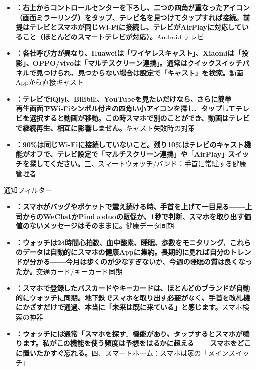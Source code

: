 \begin{itemize}
  \item \textbf{：右上からコントロールセンターを下ろし、二つの四角が重なったアイコン（画面ミラーリング）をタップ、テレビ名を見つけてタップすれば接続。前提はテレビとスマホが同じWi-Fiに接続し、テレビがAirPlayに対応していること（ほとんどのスマートテレビが対応）。}Android テレビ
  \item \textbf{：各社呼び方が異なり、Huaweiは「ワイヤレスキャスト」、Xiaomiは「投影」、OPPO/vivoは「マルチスクリーン連携」。通常はクイックスイッチパネルで見つけられ、見つからない場合は設定で「キャスト」を検索。}動画Appから直接キャスト
  \item \textbf{：テレビでiQiyi、Bilibili、YouTubeを見たいだけなら、さらに簡単——再生画面でWi-Fiシンボル付きの四角い小アイコンを探し、タップしてテレビを選択すると動画が移動。この時スマホで別のことができ、動画はテレビで継続再生、相互に影響しません。}キャスト失敗時の対策
  \item \textbf{：90\%は同じWi-Fiに接続していないこと。残り10\%はテレビのキャスト機能がオフで、テレビ設定で「マルチスクリーン連携」や「AirPlay」スイッチを探してください。}三、スマートウォッチ/バンド：手首に常駐する健康管理者
\end{itemize}


通知フィルター

\begin{itemize}
  \item \textbf{：スマホがバッグやポケットで震え続ける時、手首を上げて一目見る——上司からのWeChatかPinduoduoの販促か、1秒で判断、スマホを取り出す価値のないメッセージはそのままに。}健康データ同期
  \item \textbf{：ウォッチは24時間心拍数、血中酸素、睡眠、歩数をモニタリング、これらのデータは自動的にスマホの健康Appに集約。長期的に見れば自分のトレンドが分かる——今月は歩くのが少なすぎないか、今週の睡眠の質は良くなったか。}交通カード/キーカード同期
  \item \textbf{：スマホで登録したバスカードやキーカードは、ほとんどのブランドが自動的にウォッチに同期。地下鉄でスマホを取り出す必要がなく、手首を改札機にかざすだけで通過、本当に「未来は既に来ている」と感じます。}スマホ検索の神器
  \item \textbf{：ウォッチには通常「スマホを探す」機能があり、タップするとスマホが鳴ります。私がこの機能を使う頻度は予想をはるかに超える——スマホをどこに置いたかすぐ忘れる。}四、スマートホーム：スマホは家の「メインスイッチ」
\end{itemize}

